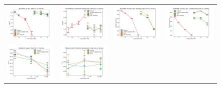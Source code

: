 \begin{figure}
	\centering
	\begin{tabular}{@{\hskip -0.0in}c@{\hskip -0.0in}c@{\hskip -0.0in}c@{\hskip -0.0in}c@{\hskip -0.0in}}
		\includegraphics[width=.245\linewidth]{figures/glove400k_qa_best-f1_vs_compression.pdf} &
		\includegraphics[width=.245\linewidth]{figures/glove400k_trec_test-err_vs_compression.pdf} &
		\includegraphics[width=.245\linewidth]{figures/glove400k_intrinsics_analogy-avg-score_vs_compression.pdf} &
		\includegraphics[width=.245\linewidth]{figures/glove400k_intrinsics_similarity-avg-score_vs_compression.pdf} \\
		\includegraphics[width=.245\linewidth]{figures/fasttext1m_qa_best-f1_vs_compression.pdf} &
		\includegraphics[width=.245\linewidth]{figures/fasttext1m_trec_test-err_vs_compression.pdf} &

\end{tabular}
\end{figure}
